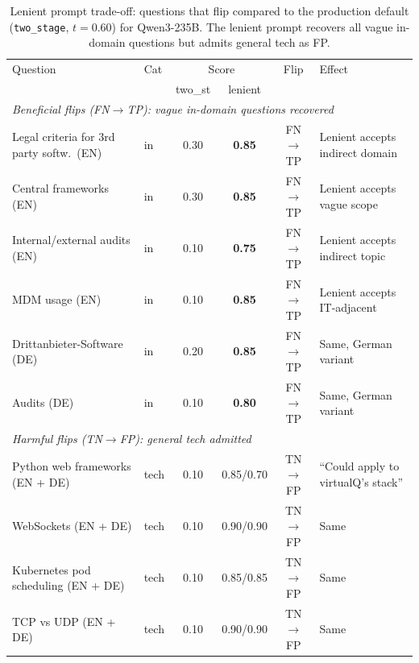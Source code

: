 \begin{table}[ht]
\centering
\caption{Lenient prompt trade-off: questions that flip compared to the production default (\texttt{two\_stage}, $t{=}0.60$) for Qwen3-235B. The lenient prompt recovers all vague in-domain questions but admits general tech as FP.}
\label{tab:dj-lenient-tradeoff}
\small
\begin{tabular}{p{5.5cm}lcccl}
\toprule
Question & Cat & \multicolumn{2}{c}{Score} & Flip & Effect \\
         &     & two\_st & lenient & & \\
\midrule
\multicolumn{6}{l}{\textit{Beneficial flips (FN$\to$TP): vague in-domain questions recovered}} \\
\midrule
Legal criteria for 3rd party softw.\ (EN)   & in   & 0.30 & \textbf{0.85} & FN$\to$TP & Lenient accepts indirect domain \\
Central frameworks (EN)                      & in   & 0.30 & \textbf{0.85} & FN$\to$TP & Lenient accepts vague scope \\
Internal/external audits (EN)                & in   & 0.10 & \textbf{0.75} & FN$\to$TP & Lenient accepts indirect topic \\
MDM usage (EN)                               & in   & 0.10 & \textbf{0.85} & FN$\to$TP & Lenient accepts IT-adjacent \\
Drittanbieter-Software (DE)                  & in   & 0.20 & \textbf{0.85} & FN$\to$TP & Same, German variant \\
Audits (DE)                                  & in   & 0.10 & \textbf{0.80} & FN$\to$TP & Same, German variant \\
\midrule
\multicolumn{6}{l}{\textit{Harmful flips (TN$\to$FP): general tech admitted}} \\
\midrule
Python web frameworks (EN + DE)              & tech & 0.10 & 0.85/0.70 & TN$\to$FP & ``Could apply to virtualQ's stack'' \\
WebSockets (EN + DE)                         & tech & 0.10 & 0.90/0.90 & TN$\to$FP & Same \\
Kubernetes pod scheduling (EN + DE)          & tech & 0.10 & 0.85/0.85 & TN$\to$FP & Same \\
TCP vs UDP (EN + DE)                         & tech & 0.10 & 0.90/0.90 & TN$\to$FP & Same \\
\bottomrule
\end{tabular}
\end{table}



